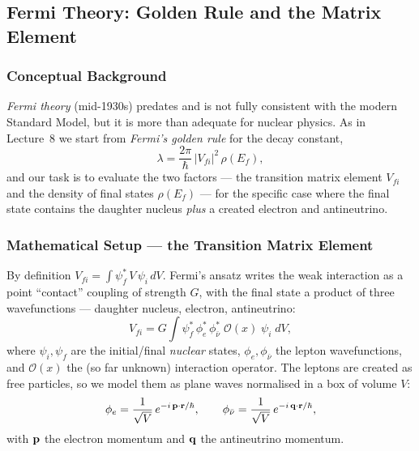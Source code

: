 \subsection{Fermi Theory: Golden Rule and the Matrix Element}
\label{subsec:lec09:fermi_theory}

\subsubsection*{Conceptual Background}
\emph{Fermi theory} (mid-1930s) predates and is not fully consistent with the
modern Standard Model, but it is more than adequate for nuclear physics. As in
Lecture~8 we start from \emph{Fermi's golden rule} for the decay constant,
\begin{equation}
  \label{eq:lec09:fgr}
  \lambda = \frac{2\pi}{\hbar}\,|V_{fi}|^2\,\rho(E_f),
\end{equation}
and our task is to evaluate the two factors --- the transition matrix element
$V_{fi}$ and the density of final states $\rho(E_f)$ --- for the specific case
where the final state contains the daughter nucleus \emph{plus} a created
electron and antineutrino.

\subsubsection*{Mathematical Setup --- the Transition Matrix Element}
By definition $V_{fi}=\int \psi_f^* \,V\, \psi_i\,dV$. Fermi's ansatz writes the
weak interaction as a point ``contact'' coupling of strength $G$, with the final
state a product of three wavefunctions --- daughter nucleus, electron,
antineutrino:
\begin{equation}
  \label{eq:lec09:Vfi}
  V_{fi} = G\!\int \psi_f^{*}\,\phi_e^{*}\,\phi_{\bar\nu}^{*}\;
           \mathcal{O}(x)\;\psi_i \; dV,
\end{equation}
where $\psi_i,\psi_f$ are the initial/final \emph{nuclear} states,
$\phi_e,\phi_{\bar\nu}$ the lepton wavefunctions, and $\mathcal{O}(x)$ the (so far
unknown) interaction operator. The leptons are created as free particles, so we
model them as plane waves normalised in a box of volume $V$:
\begin{equation}
  \label{eq:lec09:planewaves}
  \phi_e = \frac{1}{\sqrt{V}}\,e^{-i\,\mathbf{p}\cdot\mathbf{r}/\hbar},
  \qquad
  \phi_{\bar\nu} = \frac{1}{\sqrt{V}}\,e^{-i\,\mathbf{q}\cdot\mathbf{r}/\hbar},
\end{equation}
with $\mathbf{p}$ the electron momentum and $\mathbf{q}$ the antineutrino momentum.

